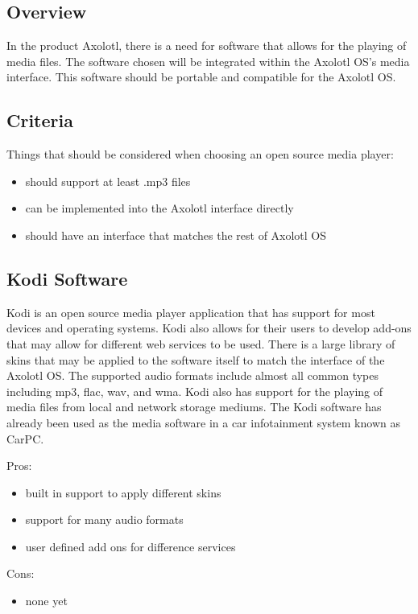 \documentclass[onecolumn, draftclsnofoot,10pt, compsoc]{IEEEtran}
\begin{document}
\subsection{Overview}
In the product Axolotl, there is a need for software that allows for the playing of media files. The software chosen will be integrated within the Axolotl OS's media interface. This software should be portable and compatible for the Axolotl OS.

\subsection{Criteria}
Things that should be considered when choosing an open source media player:
\begin{itemize}
    \item should support at least .mp3 files
    \item can be implemented into the Axolotl interface directly
    \item should have an interface that matches the rest of Axolotl OS
\end{itemize}

\subsection{Kodi Software}
Kodi is an open source media player application that has support for most devices and operating systems. Kodi also allows for their users to develop add-ons that may allow for different web services to be used. There is a large library of skins that may be applied to the software itself to match the interface of the Axolotl OS. The supported audio formats include almost all common types including mp3, flac, wav, and wma. Kodi also has support for the playing of media files from local and network storage mediums. The Kodi software has already been used as the media software in a car infotainment system known as CarPC. ~\cite{kodi:features}

Pros:
\begin{itemize}
    \item built in support to apply different skins
    \item support for many audio formats
    \item user defined add ons for difference services
\end{itemize}

Cons:
\begin{itemize}
    \item none yet
\end{itemize}
\end{document}

